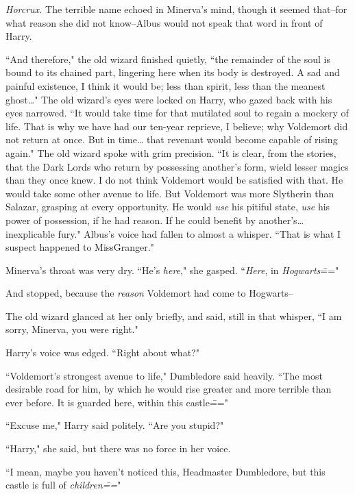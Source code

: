 \emph{Horcrux.} The terrible name echoed in Minerva's mind, though it seemed that\---for what reason she did not know\---Albus would not speak that word in front of Harry.

``And therefore," the old wizard finished quietly, ``the remainder of the soul is bound to its chained part, lingering here when its body is destroyed. A sad and painful existence, I think it would be; less than spirit, less than the meanest ghost{\ldots}" The old wizard's eyes were locked on Harry, who gazed back with his eyes narrowed. ``It would take time for that mutilated soul to regain a mockery of life. That is why we have had our ten-year reprieve, I believe; why Voldemort did not return at once. But in time{\ldots} that revenant would become capable of rising again." The old wizard spoke with grim precision. ``It is clear, from the stories, that the Dark Lords who return by possessing another's form, wield lesser magics than they once knew. I do not think Voldemort would be satisfied with that. He would take some other avenue to life. But Voldemort was more Slytherin than Salazar, grasping at every opportunity. He would \emph{use} his pitiful state, \emph{use} his power of possession, if he had reason. If he could benefit by another's{\ldots} inexplicable fury." Albus's voice had fallen to almost a whisper. ``That is what I suspect happened to Miss\?Granger."

Minerva's throat was very dry. ``He's \emph{here}," she gasped. ``\emph{Here}, in \emph{Hogwarts}\==="

And stopped, because the \emph{reason} Voldemort had come to Hogwarts\---

The old wizard glanced at her only briefly, and said, still in that whisper, ``I am sorry, Minerva, you were right."

Harry's voice was edged. ``Right about what?"

``Voldemort's strongest avenue to life," Dumbledore said heavily. ``The most desirable road for him, by which he would rise greater and more terrible than ever before. It is guarded here, within this castle\==="

``Excuse me," Harry said politely. ``Are you stupid?"

``Harry," she said, but there was no force in her voice.

``I mean, maybe you haven't noticed this, Headmaster Dumbledore, but this castle is full of \emph{children\===}"

